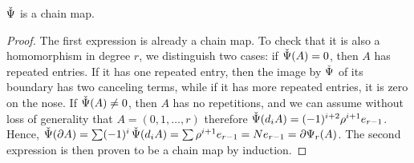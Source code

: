 \begin{lemma}
	$\operatorname{\check{\Psi}}$ is a chain map. %
\end{lemma}

\begin{proof}
	The first expression is already a chain map. To check that it is also a homomorphism in degree $r$, we distinguish two cases: if $\operatorname{\check{\Psi}}(A) = 0$, then $A$ has repeated entries. If it has one repeated entry, then the image by $\operatorname{\check{\Psi}}$ of its boundary has two canceling terms, while if it has more repeated entries, it is zero on the nose. If $\operatorname{\check{\Psi}}(A)\neq 0$, then $A$ has no repetitions, and we can assume without loss of generality that $A=(0,1,\ldots,r)$ therefore $\operatorname{\check{\Psi}}(d_iA) = (-1)^{i+2}\rho^{i+1} e_{r-1}$. Hence, $\operatorname{\check{\Psi}}(\partial A) = \sum (-1)^i\operatorname{\check{\Psi}}(d_iA) = \sum \rho^{i+1} e_{r-1} = Ne_{r-1} = \partial \Psi_r(A)$. The second expression is then proven to be a chain map by induction.
\end{proof}

